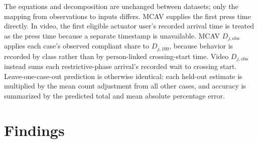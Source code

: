 \documentclass[11pt]{article}
\begin{document}
The equations and decomposition are unchanged between datasets; only the mapping from observations to inputs differs. MCAV supplies the first press time directly. In video, the first eligible actuator user's recorded arrival time is treated as the press time because a separate timestamp is unavailable. MCAV \(D_{j,\mathrm{obs}}\) applies each case's observed compliant share to \(D_{j,100}\), because behavior is recorded by class rather than by person-linked crossing-start time. Video \(D_{j,\mathrm{obs}}\) instead sums each restrictive-phase arrival's recorded wait to crossing start. Leave-one-case-out prediction is otherwise identical: each held-out estimate is multiplied by the mean count adjustment from all other cases, and accuracy is summarized by the predicted total and mean absolute percentage error.

\clearpage
\section{Findings}
\end{document}
